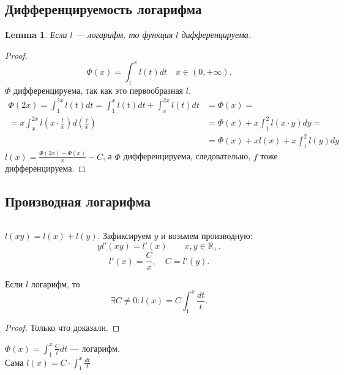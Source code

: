 \documentclass[11pt]{book}
\newcommand{\R}{\mathbb{R}}
\theoremstyle{definition}
\theoremstyle{plain}
\theoremstyle{plain}
\newtheorem*{lm}{Lemma}
\theoremstyle{definition}
\theoremstyle{remark}
\begin{document}
\subsection{Дифференцируемость логарифма}
\begin{lm}
    Если $ l$ --- логарифм, то функция $ l$   дифференцируема.
\end{lm}
\begin{proof}
    \[
	\Phi (x) = \int_1^{x}l(t) dt \quad x \in  (0, + \infty)
    .\]
    $ \Phi$  дифференцируема, так как это первообразная $ l$. 
    \[
	\begin{aligned}
	    \Phi(2x) = \int_1^{2x} l(t) dt = \int_1^{x}  l(t) dt + \int_x^{2x}l(t) dt &= \Phi(x) = \\
	    =    x \int_x^{2x} l\left(x \cdot \frac{t}{x}\right) d\left(\frac{t}{x}\right) &= \Phi (x) + x \int_1 ^{2} l(x \cdot y) dy = \\
								&= \Phi(x) + x l(x) + x \int_1^{2} l(y) dy
	\end{aligned}
    \]
    $ l(x) = \frac{\Phi(2x) -\Phi(x) }{x} - C$,
    а $ \Phi$  дифференцируема, следовательно, $ f$  тоже дифференцируема.
\end{proof}
\subsection{Производная логарифма}
\begin{thm}$ $

    $ l(xy) = l(x) + l(y)$.
    Зафиксируем $ y$ и возьмем производную:
    \[
	y l'(xy) = l'(x) \qquad x, y \in  \R_{+}
    .\]
    \[
	l'(x) = \frac{C}{x}, \quad C = l'(y)
    .\]
\end{thm}
\begin{thm}
    Если $ l$ логарифм, то \[
	\exists  C \ne 0 : l(x) = C \int_1 ^{x} \frac{dt}{t}
    .\]
\end{thm}
\begin{proof}
    Только что доказали.
\end{proof}
\begin{thm}
    $ \Phi(x) = \int_1^{x} \frac{C}{t}dt$ --- логарифм.\\
    Сама $ l (x) = C \cdot \int_1^{x} \frac{dt}{t}$
\end{thm}
\end{document}
